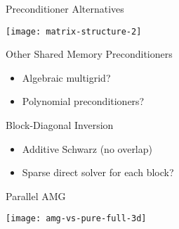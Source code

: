 \begin{frame}{Preconditioner Alternatives}

  \begin{center}
    \texttt{[image: matrix-structure-2]}
  \end{center}

  \begin{block}{Other Shared Memory Preconditioners}
   \begin{itemize}
    \item Algebraic multigrid?
    \item Polynomial preconditioners?
   \end{itemize}
  \end{block}

  
  \begin{block}{Block-Diagonal Inversion}
   \begin{itemize}
    \item Additive Schwarz (no overlap)
    \item Sparse direct solver for each block?
   \end{itemize}
  \end{block}

\end{frame}


\begin{frame}{Parallel AMG}
  \begin{center}
    \texttt{[image: amg-vs-pure-full-3d]}
  \end{center}
\end{frame}


